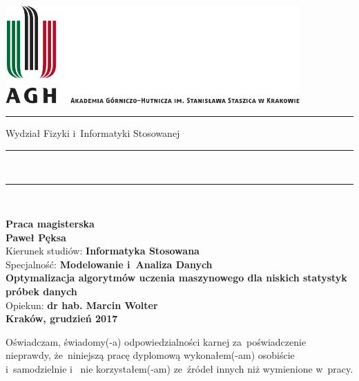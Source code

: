 
\thispagestyle{empty}
\includegraphics[height=37.5mm]{res/agh_logo.pdf}\\
\rule{30mm}{0pt}
{\large \textsf{Wydział Fizyki i~Informatyki Stosowanej}}\\
\rule{\textwidth}{3pt}\\
\rule[2ex]
{\textwidth}{1pt}\\
\vspace{7ex}
\begin{center}
{\LARGE \bf \textsf{Praca magisterska}}\\
\vspace{13ex}
{\bf \Large \textsf{Paweł Pęksa}}\\
\vspace{3ex}
{\sf\small Kierunek studiów:} {\bf\small \textsf{Informatyka Stosowana}}\\
\vspace{1.5ex}
{\sf\small Specjalność:} {\bf\small \textsf{Modelowanie i~Analiza Danych}}\\
\vspace{10ex}
{\bf \huge \textsf{Optymalizacja algorytmów uczenia maszynowego dla niskich statystyk próbek danych}}\\
\vspace{14ex}
{\Large Opiekun: \bf \textsf{dr hab. Marcin Wolter}}\\
\vspace{22ex}
{\large \bf \textsf{Kraków, grudzień 2017}}
\end{center}

\newpage

{\sf Oświadczam, świadomy(-a) odpowiedzialności karnej za~poświadczenie nieprawdy, że~niniejszą pracę dyplomową wykonałem(-am) osobiście i~samodzielnie i~ nie korzystałem(-am) ze~źródeł innych niż wymienione w~pracy.}


